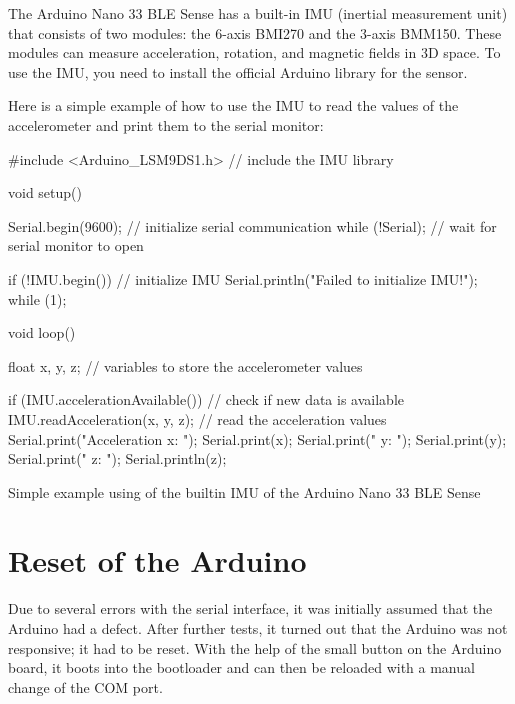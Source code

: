 \bigskip

The Arduino Nano 33 BLE Sense has a built-in IMU (inertial measurement unit) that consists of two modules: the 6-axis BMI270 and the 3-axis BMM150. These modules can measure acceleration, rotation, and magnetic fields in 3D space. To use the IMU, you need to install the official Arduino library for the sensor.

Here is a simple example of how to use the IMU to read the values of the accelerometer and print them to the serial monitor:

\begin{code}
    \begin{Arduino}
        #include <Arduino_LSM9DS1.h> // include the IMU library
        
        void setup() {
            Serial.begin(9600); // initialize serial communication
            while (!Serial); // wait for serial monitor to open
            
            if (!IMU.begin()) { // initialize IMU
                Serial.println("Failed to initialize IMU!");
                while (1);
            }
        }
        
        void loop() {
            float x, y, z; // variables to store the accelerometer values
            
            if (IMU.accelerationAvailable()) { // check if new data is available
                IMU.readAcceleration(x, y, z); // read the acceleration values
                Serial.print("Acceleration x: ");
                Serial.print(x);
                Serial.print(" y: ");
                Serial.print(y);
                Serial.print(" z: ");
                Serial.println(z);
            }
        }
    \end{Arduino}
    \caption{Simple example using of the builtin IMU of the Arduino Nano 33 BLE Sense}\label{code:imu}
\end{code}






\section{Reset of the Arduino}

Due to several errors with the serial interface, it was initially assumed that the Arduino had a defect. After further tests, it turned out that the Arduino was not responsive; it had to be reset. With the help of the small button on the Arduino board, it boots into the bootloader and can then be reloaded with a manual change of the COM port.

